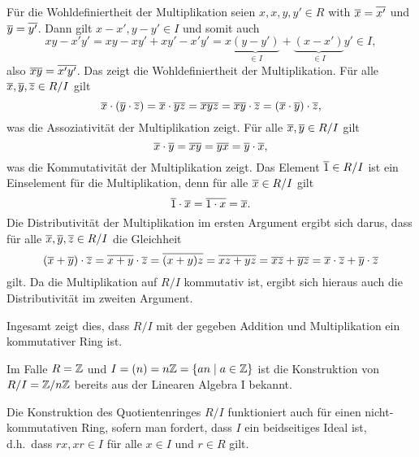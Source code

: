 Für die Wohldefiniertheit der Multiplikation seien $x, x, y, y' \in R$ with $\overline{x} = \overline{x'}$ und $\overline{y} = \overline{y'}$.
Dann gilt $x - x', y - y' \in I$ und somit auch
\[
      xy - x'y'
  =   xy - xy' + xy' - x'y'
  =   x \underbrace{(y-y')}_{\in I} + \underbrace{(x-x')}_{\in I} y'
  \in I,
\]
also $\overline{xy} = \overline{x'y'}$.
Das zeigt die Wohldefiniertheit der Multiplikation.
Für alle $\overline{x}, \overline{y}, \overline{z} \in R/I$ gilt
\[
    \overline{x} \cdot (\overline{y} \cdot \overline{z})
  = \overline{x} \cdot \overline{yz}
  = \overline{xyz}
  = \overline{xy} \cdot \overline{z}
  = (\overline{x} \cdot \overline{y}) \cdot \overline{z},
\]
was die Assoziativität der Multiplikation zeigt.
Für alle $\overline{x}, \overline{y} \in R/I$ gilt
\[
    \overline{x} \cdot \overline{y}
  = \overline{xy}
  = \overline{yx}
  = \overline{y} \cdot \overline{x},
\]
was die Kommutativität der Multiplikation zeigt.
Das Element $\overline{1} \in R/I$ ist ein Einselement für die Multiplikation, denn für alle $\overline{x} \in R/I$ gilt
\[
    \overline{1} \cdot \overline{x}
  = \overline{1 \cdot x}
  = \overline{x}.
\]
Die Distributivität der Multiplikation im ersten Argument ergibt sich darus, dass für alle $\overline{x}, \overline{y}, \overline{z} \in R/I$ die Gleichheit
\[
  (\overline{x} + \overline{y}) \cdot \overline{z}
  = \overline{x + y} \cdot \overline{z}
  = \overline{(x + y) z}
  = \overline{xz + yz}
  = \overline{xz} + \overline{yz}
  = \overline{x} \cdot \overline{z} + \overline{y} \cdot \overline{z}
\]
gilt.
Da die Multiplikation auf $R/I$ kommutativ ist, ergibt sich hieraus auch die Distributivität im zweiten Argument.

Ingesamt zeigt dies, dass $R/I$ mit der gegeben Addition und Multiplikation ein kommutativer Ring ist.

\begin{remark}
  Im Falle $R = \mathbb{Z}$ und $I = (n) = n \mathbb{Z} = \{ an \mid a \in \mathbb{Z} \}$ ist die Konstruktion von $R/I = \mathbb{Z}/n\mathbb{Z}$ bereits aus der Linearen Algebra I bekannt.
\end{remark}

\begin{remark}
  Die Konstruktion des Quotientenringes $R/I$ funktioniert auch für einen nicht-kommutativen Ring, sofern man fordert, dass $I$ ein beidseitiges Ideal ist, d.h.\ dass $r x , x r \in I$ für alle $x \in I$ und $r \in R$ gilt.
\end{remark}





\subsection{}

